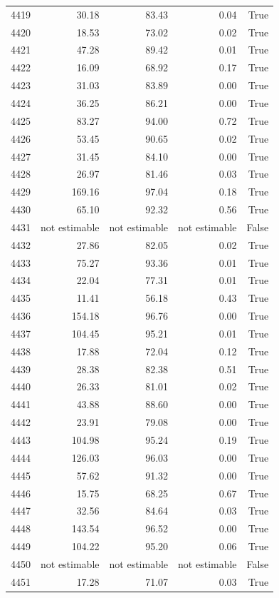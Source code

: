 \begin{longtable}{rrrrr}
4419 & 30.18 & 83.43 & 0.04 & True \\
4420 & 18.53 & 73.02 & 0.02 & True \\
4421 & 47.28 & 89.42 & 0.01 & True \\
4422 & 16.09 & 68.92 & 0.17 & True \\
4423 & 31.03 & 83.89 & 0.00 & True \\
4424 & 36.25 & 86.21 & 0.00 & True \\
4425 & 83.27 & 94.00 & 0.72 & True \\
4426 & 53.45 & 90.65 & 0.02 & True \\
4427 & 31.45 & 84.10 & 0.00 & True \\
4428 & 26.97 & 81.46 & 0.03 & True \\
4429 & 169.16 & 97.04 & 0.18 & True \\
4430 & 65.10 & 92.32 & 0.56 & True \\
4431 & not estimable & not estimable & not estimable & False \\
4432 & 27.86 & 82.05 & 0.02 & True \\
4433 & 75.27 & 93.36 & 0.01 & True \\
4434 & 22.04 & 77.31 & 0.01 & True \\
4435 & 11.41 & 56.18 & 0.43 & True \\
4436 & 154.18 & 96.76 & 0.00 & True \\
4437 & 104.45 & 95.21 & 0.01 & True \\
4438 & 17.88 & 72.04 & 0.12 & True \\
4439 & 28.38 & 82.38 & 0.51 & True \\
4440 & 26.33 & 81.01 & 0.02 & True \\
4441 & 43.88 & 88.60 & 0.00 & True \\
4442 & 23.91 & 79.08 & 0.00 & True \\
4443 & 104.98 & 95.24 & 0.19 & True \\
4444 & 126.03 & 96.03 & 0.00 & True \\
4445 & 57.62 & 91.32 & 0.00 & True \\
4446 & 15.75 & 68.25 & 0.67 & True \\
4447 & 32.56 & 84.64 & 0.03 & True \\
4448 & 143.54 & 96.52 & 0.00 & True \\
4449 & 104.22 & 95.20 & 0.06 & True \\
4450 & not estimable & not estimable & not estimable & False \\
4451 & 17.28 & 71.07 & 0.03 & True \\

\end{longtable}
